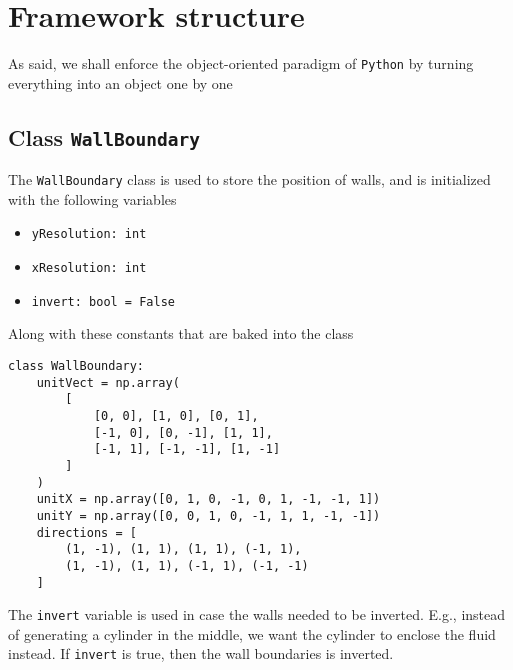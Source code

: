 \chapter{Framework structure}
\label{sec:model-structure}

As said, we shall enforce the object-oriented paradigm of \texttt{Python} by turning everything into an object one by one

\section[Class: wall boundary condition]{Class \texttt{WallBoundary}}
\label{sec:class-wall-boundary}

The \texttt{WallBoundary} class is used to store the position of walls, and is initialized with the following variables
\begin{itemize}[noitemsep]
	\item \texttt{yResolution: int}
	\item \texttt{xResolution: int}
	\item \texttt{invert: bool = False}
\end{itemize}
Along with these constants that are baked into the class
\begin{verbatim}
class WallBoundary:
    unitVect = np.array(
        [
            [0, 0], [1, 0], [0, 1],
            [-1, 0], [0, -1], [1, 1],
            [-1, 1], [-1, -1], [1, -1]
        ]
    )
    unitX = np.array([0, 1, 0, -1, 0, 1, -1, -1, 1])
    unitY = np.array([0, 0, 1, 0, -1, 1, 1, -1, -1])
    directions = [
        (1, -1), (1, 1), (1, 1), (-1, 1), 
        (1, -1), (1, 1), (-1, 1), (-1, -1)
    ]
\end{verbatim}

The \texttt{invert} variable is used in case the walls needed to be inverted. E.g., instead of generating a cylinder in the middle, we want the cylinder to enclose the fluid instead. If \texttt{invert} is true, then the wall boundaries is inverted.

